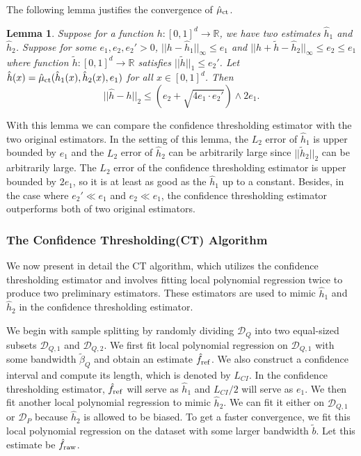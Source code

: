 \documentclass{article}
\def\R{\mathbb{R}}
\def\D{\mathcal{D}}
\newtheorem{lemma}{Lemma}
\begin{document}
The following lemma justifies the convergence of $\hat \mu_{\rm ct}$.
\begin{lemma}\label{lemma: st}
Suppose for a function $h:[0,1]^d\rightarrow \R$, we have two estimates $\hat h_1$ and $\hat h_2$. Suppose for some $e_1,e_2,e_2'>0$, $||h-\hat h_1||_\infty \leq e_1$ and
$||h+\tilde h-\hat h_2||_\infty \leq e_2\leq e_1$ where function $\tilde h:[0,1]^d\rightarrow \R$ satisfies $||\tilde h||_1\leq e_2'$. Let $\hat h(x)= \hat \mu_{\rm ct}(\hat h_1(x),\hat h_2(x),e_1)$ for all $x\in [0,1]^d$. Then $$||\hat h-h||_2\leq (e_2+\sqrt{4e_1\cdot e_2'})\wedge 2e_1.$$
\end{lemma}
With this lemma we can compare the confidence thresholding estimator with the two original estimators. In the setting of this lemma, the $L_2$ error of $\hat h_1$ is upper bounded by $e_1$ and the $L_2$ error of $\hat h_2$ can be arbitrarily large since $||\tilde h_2||_2$ can be arbitrarily large. The $L_2$ error of the confidence thresholding estimator is upper bounded by $2e_1$, so it is at least as good as the $\hat h_1$ up to a constant. Besides, in the case where $e_2'\ll e_1$ and $e_2\ll  e_1$, the confidence thresholding estimator outperforms both of two original estimators. 

\subsubsection{The Confidence Thresholding(CT) Algorithm} 



We now present in detail the CT algorithm, which utilizes the confidence thresholding estimator and involves fitting local polynomial regression twice to produce two preliminary estimators. These estimators are used to mimic $\hat h_1$ and $\hat h_2$ in the confidence thresholding estimator.

 
We begin with sample splitting by randomly dividing $\D_Q$  into two equal-sized subsets $\D_{Q,1}$ and $\D_{Q,2}$. We first fit local polynomial regression on $\D_{Q,1}$ with some bandwidth $\tilde \beta_Q$ and obtain an estimate $\hat f_{\rm ref}$. We also construct a confidence interval and compute its length, which is denoted by $L_{CI}$. In the confidence thresholding estimator, $\hat f_{\rm ref}$ will serve as $\hat h_1$ and $L_{CI}/2$ will serve as $e_1$.
We then fit another local polynomial regression to mimic $\hat h_2$. We can fit it either on $\D_{Q,1}$ or $\D_{P}$ because $\hat h_2$ is allowed to be biased. To get a faster convergence, we fit this local polynomial regression  on the dataset  with some larger bandwidth $\tilde b$. Let this estimate be $\hat f_{\rm raw}$.
\end{document}
